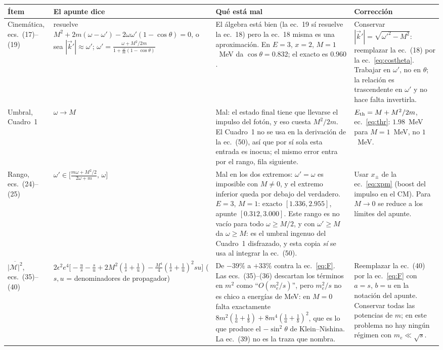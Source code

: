\documentclass[11pt,a4paper]{article}
\newcommand{\eps}{\epsilon}
\begin{document}
{\small
\begin{longtable}{@{}p{2.3cm}p{4.2cm}p{3.9cm}p{4.6cm}@{}}
\toprule
Ítem & El apunte dice & Qué está mal & Corrección \\
\midrule
\endhead
Cinemática, ecs.~(17)--(19) & resuelve $M^2+2m(\omega-\omega')-2\omega\omega'(1-\cos\theta)=0$, o sea $|\vec k'|\approx\omega'$;
$\omega'=\frac{\omega+M^2/2m}{1+\frac{\omega}{m}(1-\cos\theta)}$ &
El álgebra está bien (la ec.~19 sí resuelve la ec.~18) pero la ec.~18 misma es una aproximación. En $E=3$, $x=2$,
$M=1$~MeV da $\cos\theta=0.832$; el exacto es $0.960$. &
Conservar $|\vec k'|=\sqrt{\omega'^2-M^2}$: reemplazar la ec.~(18) por la ec.~\eqref{eq:costheta}. Trabajar en
$\omega'$, no en $\theta$; la relación es trascendente en $\omega'$ y no hace falta invertirla.\\
Umbral, Cuadro~1 & $\omega\to M$ & Mal: el estado final tiene que llevarse el impulso del fotón, y eso cuesta $M^2/2m$.
El Cuadro~1 no se usa en la derivación de la ec.~(50), así que por sí sola esta entrada es inocua; el mismo error entra
por el rango, fila siguiente. & $E_{\rm th}=M+M^2/2m$, ec.~\eqref{eq:thr}: $1.98$~MeV para $M=1$~MeV, no $1$~MeV.\\
Rango, ecs.~(24)--(25) & $\omega'\in\big[\frac{m\omega+M^2/2}{2\omega+m},\,\omega\big]$ &
Mal en los dos extremos: $\omega'=\omega$ es imposible con $M\neq0$, y el extremo inferior queda por debajo del
verdadero. $E=3$, $M=1$: exacto $[1.336,2.955]$, apunte $[0.312,3.000]$. Este rango es no vacío para todo $\omega\ge M/2$,
y con $\omega'\ge M$ da $\omega\ge M$: es el umbral ingenuo del Cuadro~1 disfrazado, y esta copia \emph{sí} se usa al
integrar la ec.~(50). &
Usar $x_\pm$ de la ec.~\eqref{eq:xpm} (boost del impulso en el CM). Para $M\to0$ se reduce a los límites del apunte.\\
$\overline{|\mathcal M|^2}$, ecs.~(35)--(40) & $2\eps^2e^4\big[-\frac us-\frac su+2M^2(\frac1s+\frac1u)-\frac{M^4}{4}(\frac1s+\frac1u)^2su\big]$
($s,u$ = denominadores de propagador) &
De $-39\%$ a $+33\%$ contra la ec.~\eqref{eq:F}. Las ecs.~(35)--(36) descartan los términos en $m^2$ como
``$O(m_e^2/s)$'', pero $m_e^2/s$ no es chico a energías de MeV: en $M=0$ falta exactamente
$8m^2(\frac1a+\frac1b)+8m^4(\frac1a+\frac1b)^2$, que es lo que produce el $-\sin^2\theta$ de Klein--Nishina. La
ec.~(39) no es la traza que nombra. &
Reemplazar la ec.~(40) por la ec.~\eqref{eq:F} con $a=s$, $b=u$ en la notación del apunte. Conservar todas las
potencias de $m$; en este problema no hay ningún régimen con $m_e\ll\sqrt s$.\\

\end{longtable}}
\end{document}
